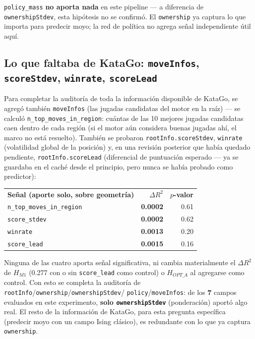 \documentclass[11pt, a4paper]{article}
\newcommand{\TH}[1]{\cellcolor{cTHbg}\color{white}\textbf{#1}}
\newcommand{\bad}[1]{\color{cBad}\textbf{#1}}
\begin{document}
\texttt{policy\_mass} \textbf{no aporta nada} en este pipeline ---
a diferencia de \texttt{ownershipStdev}, esta hip\'otesis no se
confirm\'o. El \texttt{ownership} ya captura lo que importa para
predecir moyo; la red de pol\'itica no agrega se\~nal independiente
\'util aqu\'i.

\subsection{Lo que faltaba de KataGo: \texttt{moveInfos}, \texttt{scoreStdev}, \texttt{winrate}, \texttt{scoreLead}}

Para completar la auditor\'ia de toda la informaci\'on disponible de
KataGo, se agreg\'o tambi\'en \texttt{moveInfos} (las jugadas candidatas
del motor en la ra\'iz) --- se calcul\'o \texttt{n\_top\_moves\_in\_region}:
cu\'antas de las 10 mejores jugadas candidatas caen dentro de cada
regi\'on (si el motor a\'un considera buenas jugadas ah\'i, el marco
no est\'a resuelto). Tambi\'en se probaron \texttt{rootInfo.scoreStdev},
\texttt{winrate} (volatilidad global de la posici\'on) y, en una
revisi\'on posterior que hab\'ia quedado pendiente,
\texttt{rootInfo.scoreLead} (diferencial de puntuaci\'on esperado ---
ya se guardaba en el cach\'e desde el principio, pero nunca se hab\'ia
probado como predictor):

\medskip
\begin{center}
\begin{tabular}{lrr}
  \TH{Se\~nal (aporte solo, sobre geometr\'ia)} & \TH{$\Delta R^2$} & \TH{$p$-valor} \\[1pt]
  \texttt{n\_top\_moves\_in\_region} & \bad{0.0002} & 0.61 \\
  \texttt{score\_stdev}              & \bad{0.0002} & 0.62 \\
  \texttt{winrate}                   & \bad{0.0013} & 0.20 \\
  \texttt{score\_lead}               & \bad{0.0015} & 0.16 \\
\end{tabular}
\end{center}
\medskip

\begin{tcolorbox}[quotebox]
  Ninguna de las cuatro aporta se\~nal significativa, ni cambia
  materialmente el $\Delta R^2$ de $H_{M1}$ (0.277 con o sin
  \texttt{score\_lead} como control) o $H_{OPT\_A}$ al agregarse como
  control. Con esto se completa la auditor\'ia de
  \texttt{rootInfo}/\texttt{ownership}/\texttt{ownershipStdev}/%
  \texttt{policy}/\texttt{moveInfos}: de los \textbf{7} campos
  evaluados en este experimento, \textbf{solo \texttt{ownershipStdev}}
  (ponderaci\'on) aport\'o algo real. El resto de la informaci\'on de
  KataGo, para esta pregunta espec\'ifica (predecir moyo con un campo
  Ising cl\'asico), es redundante con lo que ya captura
  \texttt{ownership}.
\end{tcolorbox}
\end{document}
